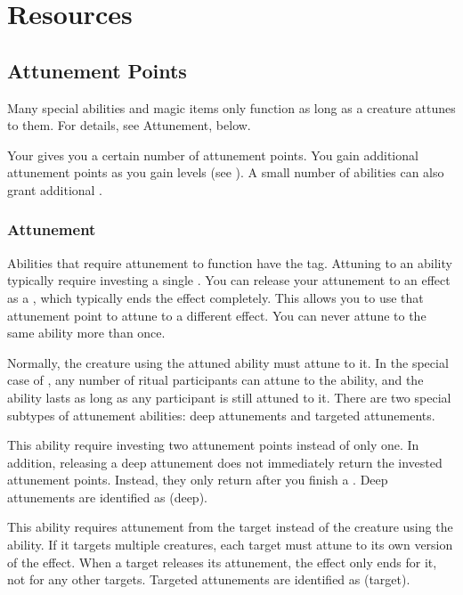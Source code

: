 \section{Resources}\label{Resources}

    \subsection{Attunement Points}\label{Attunement Points}
        Many special abilities and magic items only function as long as a creature attunes to them.
        For details, see Attunement, below.

        Your  gives you a certain number of attunement points.
        You gain additional attunement points as you gain levels (see ).
        A small number of abilities can also grant additional .

        \subsubsection{Attunement}\label{Attunement}
            Abilities that require attunement to function have the  tag.
            Attuning to an ability typically require investing a single .
            You can release your attunement to an effect as a , which typically ends the effect completely.
            This allows you to use that attunement point to attune to a different effect.
            You can never attune to the same ability more than once.

            Normally, the creature using the attuned ability must attune to it.
            In the special case of , any number of ritual participants can attune to the ability, and the ability lasts as long as any participant is still attuned to it.
            There are two special subtypes of attunement abilities: deep attunements and targeted attunements.

             This ability require investing two attunement points instead of only one.
            In addition, releasing a deep attunement does not immediately return the invested attunement points.
            Instead, they only return after you finish a .
            Deep attunements are identified as  (deep).

             This ability requires attunement from the target instead of the creature using the ability.
            If it targets multiple creatures, each target must attune to its own version of the effect.
            When a target releases its attunement, the effect only ends for it, not for any other targets.
            Targeted attunements are identified as  (target).

